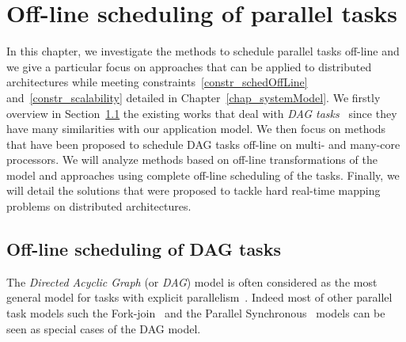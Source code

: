 \documentclass[main.tex]{subfiles}
\begin{document}
\chapter{Off-line scheduling of parallel tasks}
\thispagestyle{chapstyle}
\label{chap_schedParallelTasks}
\minitoc

In this chapter, we investigate the methods to schedule parallel tasks off-line
and we give a particular focus on approaches that can be applied to distributed
architectures while meeting constraints~\ref{constr_schedOffLine}
and~\ref{constr_scalability} detailed in Chapter~\ref{chap_systemModel}. We
firstly overview in Section~\ref{sec_stateOfTheArt_2_DAGsched} the existing
works that deal with \emph{DAG tasks}~\cite{Baruah2012_RTSS} since they have
many similarities with our application model. We then focus on methods that
have been proposed to schedule DAG tasks off-line on multi- and many-core
processors. We will analyze methods based on off-line transformations of the
model and approaches using complete off-line scheduling of the tasks. Finally,
we will detail the solutions that were proposed to tackle hard real-time
mapping problems on distributed architectures. 

\section{Off-line scheduling of DAG tasks}
\label{sec_stateOfTheArt_2_DAGsched}

The \emph{Directed Acyclic Graph} (or \emph{DAG}) model is often considered as
the most general model for tasks with explicit
parallelism~\cite{Baruah2012_RTSS}. Indeed most of other parallel task models
such the Fork-join~\cite{Lakshmanan2010} and the Parallel
Synchronous~\cite{Saifullah2011} models can be seen as special cases of the DAG
model.
\end{document}
